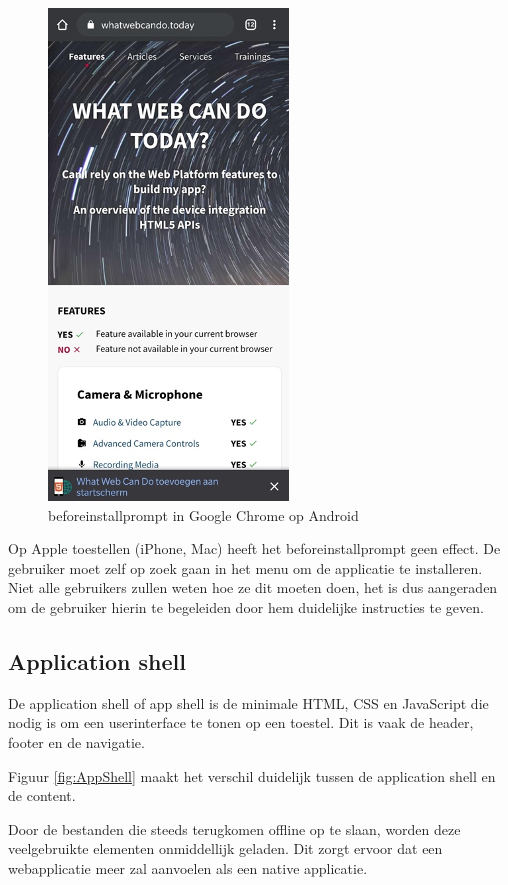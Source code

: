 	\begin{figure}[H]
		\centering
		\includegraphics{./img/beforeinstallprompt_android.png}
		\caption{beforeinstallprompt in Google Chrome op Android}
		\label{fig:A2HSAndroid}
	\end{figure}
	
	Op Apple toestellen (iPhone, Mac) heeft het beforeinstallprompt geen effect. De gebruiker moet zelf op zoek gaan in het menu om de applicatie te installeren.
	Niet alle gebruikers zullen weten hoe ze dit moeten doen, het is dus aangeraden om de gebruiker hierin te begeleiden door hem duidelijke instructies te geven.
	\autocite{PWAbuilder2020}


\subsection{Application shell}
	De application shell of app shell is de minimale HTML, CSS en JavaScript die nodig is om een userinterface te tonen op een toestel. Dit is vaak de header, footer en de navigatie.
	
	Figuur \ref{fig:AppShell} maakt het verschil duidelijk tussen de application shell en de content.
	
	Door de bestanden die steeds terugkomen offline op te slaan, worden deze veelgebruikte elementen onmiddellijk geladen. Dit zorgt ervoor dat een webapplicatie meer zal aanvoelen als een native applicatie.
	
